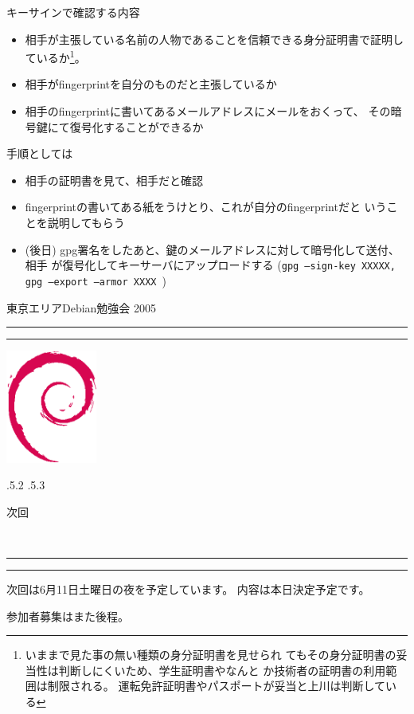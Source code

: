 \documentclass[mingoth]{jsarticle}
\makeatletter
\renewcommand{\section}{\@startsection{section}{1}{\z@}%
    {\Cvs \@plus.5\Cdp \@minus.2\Cdp}%
    {.5\Cvs \@plus.3\Cdp}%
    {\normalfont\Large\headfont\raggedright\centering}} %
\newcommand{\dancersection}[2]{%
\newpage
東京エリアDebian勉強会 2005
\hrule
\vspace{0.5mm}
\hrule
\hfill{}\includegraphics[width=3cm]{image200502/openlogo-nd.eps}\\
\vspace{-4cm}
\begin{center}
  \section{#1}
\end{center}
\hfill{}#2\hspace{3cm}\space\\
\hrule
\hrule
\vspace{1cm}
}
\makeatother
\begin{document}
キーサインで確認する内容
\begin{itemize}
 \item 相手が主張している名前の人物であることを信頼できる身分証明書で証明し
       ているか\footnote{いままで見た事の無い種類の身分証明書を見せられ
       てもその身分証明書の妥当性は判断しにくいため、学生証明書やなんと
       か技術者の証明書の利用範囲は制限される。
       運転免許証明書やパスポートが妥当と上川は判断している}。
 \item 相手がfingerprintを自分のものだと主張しているか
 \item 相手のfingerprintに書いてあるメールアドレスにメールをおくって、
       その暗号鍵にて復号化することができるか
\end{itemize}

手順としては
\begin{itemize}
 \item 相手の証明書を見て、相手だと確認
 \item fingerprintの書いてある紙をうけとり、これが自分のfingerprintだと
       いうことを説明してもらう
 \item (後日) gpg署名をしたあと、鍵のメールアドレスに対して暗号化して送付、相手
       が復号化してキーサーバにアップロードする
       ({\tt gpg --sign-key XXXXX, gpg --export --armor XXXX })
\end{itemize}


\dancersection{次回}{}

次回は6月11日土曜日の夜を予定しています。
内容は本日決定予定です。

参加者募集はまた後程。
\end{document}
